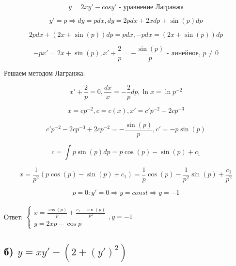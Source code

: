 \documentclass{article}
\begin{document}
\begin{equation*}
    y = 2xy' - cosy' \text{ - уравнение Лагранжа}
\end{equation*}

\begin{equation*}
    y' = p \Rightarrow dy = pdx, dy = 2pdx + 2xdp + \sin{(p)}dp
\end{equation*}

\begin{equation*}
    2pdx + (2x + \sin{(p)})dp = pdx, -pdx = (2x + \sin{(p)})dp
\end{equation*}

\begin{equation*}
    -px' = 2x + \sin{(p)} , x' + \frac{2}{p} = -\frac{\sin{(p)}}{p} \text{ - линейное, } p \ne 0
\end{equation*}

Решаем методом Лагранжа:

\begin{equation*}
    x' + \frac{2}{p} = 0, \frac{dx}{x} = -\frac{2}{p}dp, \ln{x} = \ln{p^{-2}}
\end{equation*}

\begin{equation*}
    x = cp^{-2}, c = c(x), x' = c'p^{-2} - 2cp^{-3}
\end{equation*}

\begin{equation*}
    c'p^{-2} - 2cp^{-3} + 2cp^{-2} = -\frac{\sin{(p)}}{p}, c' = -p\sin{(p)}
\end{equation*}

\begin{equation*}
    c = \int{p\sin{(p)}dp} = p\cos{(p)} - \sin{(p)} + c_1
\end{equation*}

\begin{equation*}
    x = \frac{1}{p^2}(p\cos{(p)} - \sin{(p)} + c_1) = \frac{1}{p}\cos{(p)} - \frac{1}{p^2}\sin{(p)} + \frac{c_1}{p^2}
\end{equation*}

\begin{equation*}
    p = 0: y' = 0 \Rightarrow y = const \Rightarrow y = -1
\end{equation*}
\\
Ответ:
$
    \begin{cases}
    x = \frac{\cos{(p)}}{p} + \frac{c_1 - \sin{(p)}}{p^2} \\
    y = 2xp - \cos{p}
    \end{cases} , y = -1
$
\subsection*{б) $y = xy' - (2 + (y')^2)$}
\end{document}
